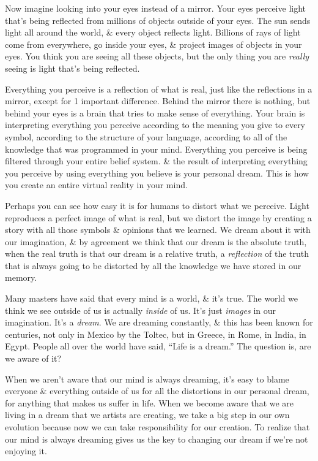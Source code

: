 \documentclass{article}
\numberwithin{equation}{section}
\begin{document}
Now imagine looking into your eyes instead of a mirror. Your eyes perceive light that's being reflected from millions of objects outside of your eyes. The sun sends light all around the world, \& every object reflects light. Billions of rays of light come from everywhere, go inside your eyes, \& project images of objects in your eyes. You think you are seeing all these objects, but the only thing you are \textit{really} seeing is light that's being reflected.

Everything you perceive is a reflection of what is real, just like the reflections in a mirror, except for 1 important difference. Behind the mirror there is nothing, but behind your eyes is a brain that tries to make sense of everything. Your brain is interpreting everything you perceive according to the meaning you give to every symbol, according to the structure of your language, according to all of the knowledge that was programmed in your mind. Everything you perceive is being filtered through your entire belief system. \& the result of interpreting everything you perceive by using everything you believe is your personal dream. This is how you create an entire virtual reality in your mind.

Perhaps you can see how easy it is for humans to distort what we perceive. Light reproduces a perfect image of what is real, but we distort the image by creating a story with all those symbols \& opinions that we learned. We dream about it with our imagination, \& by agreement we think that our dream is the absolute truth, when the real truth is that our dream is a relative truth, a \textit{reflection} of the truth that is always going to be distorted by all the knowledge we have stored in our memory.

Many masters have said that every mind is a world, \& it's true. The world we think we see outside of us is actually \textit{inside} of us. It's just \textit{images} in our imagination. It's a \textit{dream}. We are dreaming constantly, \& this has been known for centuries, not only in Mexico by the Toltec, but in Greece, in Rome, in India, in Egypt. People all over the world have said, ``Life is a dream.'' The question is, are we aware of it?

When we aren't aware that our mind is always dreaming, it's easy to blame everyone \& everything outside of us for all the distortions in our personal dream, for anything that makes us suffer in life. When we become aware that we are living in a dream that we artists are creating, we take a big step in our own evolution because now we can take responsibility for our creation. To realize that our mind is always dreaming gives us the key to changing our dream if we're not enjoying it.
\end{document}
